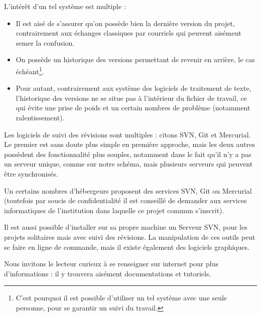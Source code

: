 L'intérêt d'un tel système est multiple :
\begin{itemize}
\item Il est aisé de s'assurer qu'on possède bien la dernière version du projet, contrairement aux échanges classiques par courriels qui peuvent aisément semer la confusion.
\item On possède un historique des versions permettant de revenir en arrière, le cas échéant\footnote{C'est pourquoi il est possible d'utiliser un tel système avec une seule personne, pour se garantir un suivi du travail.}.
\item Pour autant, contrairement aux système des logiciels de traitement de texte, l'historique des versions ne se situe pas à l'intérieur du fichier de travail, ce qui évite une prise de poids et un certain nombres de problème (notamment ralentissement).
\end{itemize}



Les logiciels de suivi des révisions sont multiples : citons SVN, Git et Mercurial. Le premier est sans doute plus simple en première approche, mais les deux autres possèdent des fonctionnalité plus souples, notamment dans le fait qu'il n'y a pas un serveur unique, comme sur notre schéma, mais plusieurs serveurs qui peuvent être synchronisés.

Un certains nombres d'hébergeurs proposent des services SVN, Git ou Mercurial (toutefois par soucis de confidentialité il est conseillé de demander aux services informatiques de l'institution dans laquelle ce projet commun s'inscrit). 

Il est aussi possible d'installer sur sa propre machine un Serveur SVN, pour les projets solitaires mais avec suivi des révisions.
La manipulation de ces outils peut se faire en ligne de commande, mais il existe également des logiciels graphiques.

Nous invitons le lecteur curieux à se renseigner sur internet pour plus d'informations : il y trouvera aisément documentations et tutoriels.